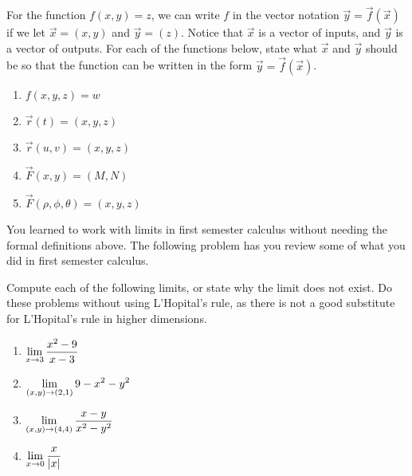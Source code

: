 \begin{problem}
 For the function $f(x,y)=z$, we can write $f$ in the vector notation $\vec y=\vec f(\vec x)$ if we let $\vec x=(x,y)$ and $\vec y=(z)$. Notice that $\vec x$ is a vector of inputs, and $\vec y$ is a vector of outputs. 
 For each of the functions below, state what $\vec x$ and $\vec y$ should be so that the function can be written in the form $\vec y = \vec f (\vec x)$.   
\begin{enumerate}
 \item $f(x,y,z)=w$
 \item $\vec r(t)=(x,y,z)$
 \item $\vec r(u,v)=(x,y,z)$
 \item $\vec F(x,y)=(M,N)$
 \item $\vec F(\rho,\phi,\theta)=(x,y,z)$
\end{enumerate}
\end{problem}


You learned to work with limits in first semester calculus without needing the formal definitions above. The following problem has you review some of what you did in first semester calculus.
\begin{problem}%
 Compute each of the following limits, or state why the limit does not exist. Do these problems without using L'Hopital's rule, as there is not a good substitute for L'Hopital's rule in higher dimensions. 
\begin{enumerate}
 \item $\displaystyle\lim_{x\to 3}\frac{x^2-9}{x-3}$
 \item $\displaystyle\lim_{(x,y)\to (2,1)} 9-x^2-y^2$
 \item $\displaystyle\lim_{(x,y)\to (4,4)} \frac{x-y}{x^2-y^2}$
 \item $\displaystyle\lim_{x\to 0}\frac{x}{|x|}$
\end{enumerate}
\end{problem}

